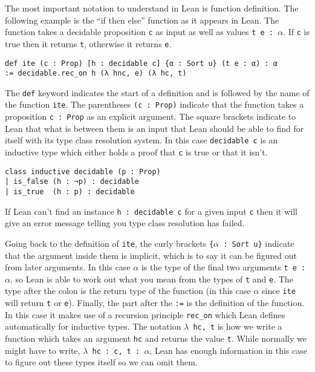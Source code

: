 \documentclass{article}
\renewcommand{\a}{\alpha}
\newcommand{\ct}{\texttt}
\begin{document}
The most important notation to understand in Lean is function definition.
The following example is the ``if then else'' function as it appears in Lean.
The function takes a decidable proposition \ct{c} as input as well as values \ct{t e : $\a$}.
If \ct{c} is true then it returns \ct{t}, otherwise it returns \ct{e}.
\begin{lstlisting}
def ite (c : Prop) [h : decidable c] {α : Sort u} (t e : α) : α 
:= decidable.rec_on h (λ hnc, e) (λ hc, t)
\end{lstlisting}
The \ct{def} keyword indicates the start of a definition and is followed by the name of the function \ct{ite}.
The parentheses \ct{(c : Prop)} indicate that the function takes a proposition \ct{c : Prop} as an explicit argument.
The square brackets indicate to Lean that what is between them is an input that Lean should be able to find for itself with its type class resolution system.
In this case \ct{decidable c} is an inductive type which either holds a proof that \ct{c} is true or that it isn't.
\begin{lstlisting}
class inductive decidable (p : Prop)
| is_false (h : ¬p) : decidable
| is_true  (h : p) : decidable

\end{lstlisting}
If Lean can't find an instance \ct{h : decidable c} for a given input \ct{c} then it will give an error message telling you type class resolution has failed.

Going back to the definition of \ct{ite}, the curly brackets \ct{\{$\a$ : Sort u\}} indicate that the argument inside them is implicit, which is to say it can be figured out from later arguments.
In this case $\a$ is the type of the final two arguments \ct{t e : $\a$}, so Lean is able to work out what you mean from the types of \ct{t} and \ct{e}.
The type after the colon is the return type of the function (in this case \ct{$\a$} since \ct{ite} will return \ct{t} or \ct{e}).
Finally, the part after the \ct{:=} is the definition of the function. 
In this case it makes use of a recursion principle \ct{rec\_on} which Lean defines automatically for inductive types.
The notation \ct{$\lambda$ hc, t} is how we write a function which takes an argument \ct{hc} and returns the value \ct{t}.
While normally we might have to write, \ct{$\lambda$ hc : c, t : $\a$}, Lean has enough information in this case to figure out these types itself so we can omit them.
\end{document}
